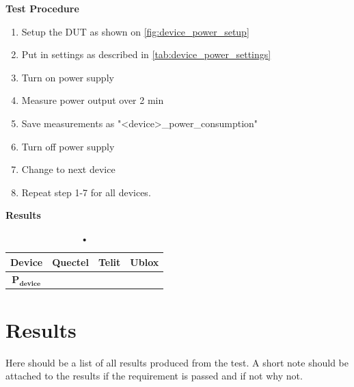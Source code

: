 \textbf{Test Procedure}\\
\begin{enumerate}
\item Setup the \gls{DUT} as shown on \autoref{fig:device_power_setup}
\item Put in settings as described in \autoref{tab:device_power_settings} 
\item Turn on power supply 
\item Measure power output over 2 min
\item Save measurements as "<device>\_power\_consumption"
\item Turn off power supply
\item Change to next device
\item Repeat step 1-7 for all devices.
\end{enumerate}

\textbf{Results}\\
\begin{table}[H]
\centering
\begin{tabular}{|c|c|c|c|}\hline
\textbf{Device}	& Quectel	& Telit & Ublox \\ \hline
$\mathbf{P_{device}}$	& & & \\ \hline
\end{tabular}
\caption{•}
\label{tab:device_power_results}
\end{table}




\section{Results}
Here should be a list of all results produced from the test. A short note should be attached to the results if the requirement is passed and if not why not.

